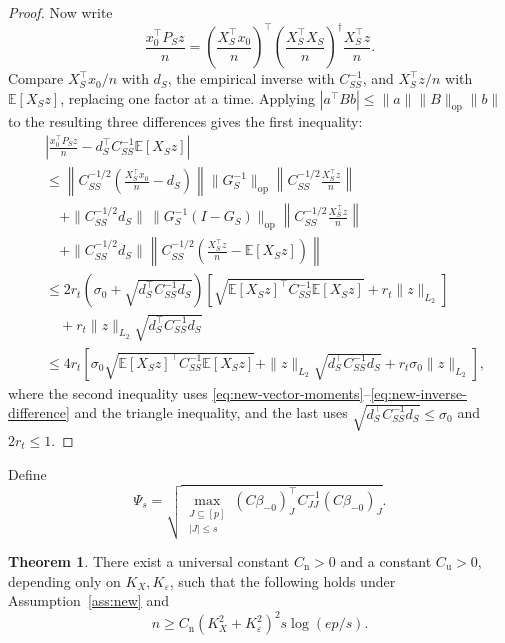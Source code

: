\documentclass[a4paper,10pt,english]{article}
\theoremstyle{definition}
\newtheorem{theorem}[proposition]{Theorem}
\begin{document}
\begin{review}
\begin{proof}
Now write
\[
 \frac{x_0^\top P_Sz}{n}
 =
 \left(\frac{X_S^\top x_0}{n}\right)^\top
 \left(\frac{X_S^\top X_S}{n}\right)^\dagger
 \frac{X_S^\top z}{n}.
\]
\rbreak
Compare \(X_S^\top x_0/n\) with \(d_S\), the empirical inverse with
\(C_{SS}^{-1}\), and \(X_S^\top z/n\) with \(\mathbb E[X_Sz]\),
replacing one factor at a time.
\rbreak
Applying \(|a^\top B b|\le\|a\|\|B\|_{\mathrm{op}}\|b\|\)
to the resulting three differences gives the first inequality:
\begin{equation}\label{eq:new-projected-assembly}
 \begin{aligned}
 &\left|
 \frac{x_0^\top P_Sz}{n}
 -d_S^\top C_{SS}^{-1}\mathbb E[X_Sz]
 \right|\\
 &\le
 \left\|
 C_{SS}^{-1/2}\left(\frac{X_S^\top x_0}{n}-d_S\right)
 \right\|
 \|G_S^{-1}\|_{\mathrm{op}}
 \left\|C_{SS}^{-1/2}\frac{X_S^\top z}{n}\right\|\\
 &\quad+
 \|C_{SS}^{-1/2}d_S\|\,
 \|G_S^{-1}(I-G_S)\|_{\mathrm{op}}
 \left\|C_{SS}^{-1/2}\frac{X_S^\top z}{n}\right\|\\
 &\quad+
 \|C_{SS}^{-1/2}d_S\|
 \left\|
 C_{SS}^{-1/2}\left(\frac{X_S^\top z}{n}-\mathbb E[X_Sz]\right)
 \right\|\\
 &\le
 2r_t\left(\sigma_0+\sqrt{d_S^\top C_{SS}^{-1}d_S}\right)
 \left[
 \sqrt{\mathbb E[X_Sz]^\top C_{SS}^{-1}\mathbb E[X_Sz]}
 +r_t\|z\|_{L_2}
 \right]\\
 &\quad+
 r_t\|z\|_{L_2}\sqrt{d_S^\top C_{SS}^{-1}d_S}\\
 &\le
 4r_t\left[
 \sigma_0
 \sqrt{\mathbb E[X_Sz]^\top C_{SS}^{-1}\mathbb E[X_Sz]}
 +\|z\|_{L_2}\sqrt{d_S^\top C_{SS}^{-1}d_S}
 +r_t\sigma_0\|z\|_{L_2}
 \right],
 \end{aligned}
\end{equation}
where the second inequality uses
\eqref{eq:new-vector-moments}--\eqref{eq:new-inverse-difference}
and the triangle inequality, and the last uses
\(\sqrt{d_S^\top C_{SS}^{-1}d_S}\le\sigma_0\) and \(2r_t\le1\).
\end{proof}

Define
\begin{equation}\label{eq:new-psi}
 \Psi_s
 =
 \sqrt{
 \max_{\substack{J\subseteq[p]\\|J|\le s}}
 (C\beta_{-0})_J^\top C_{JJ}^{-1}(C\beta_{-0})_J
 }.
\end{equation}

\begin{theorem}\label{thm:new-search}
There exist a universal constant \(C_{\mathrm n}>0\) and a constant
\(C_{\mathrm u}>0\), depending only on \(K_X,K_\varepsilon\),
such that the following holds under Assumption~\ref{ass:new} and
\begin{equation}\label{eq:new-search-sample-size}
 n\ge
 C_{\mathrm n}(K_X^2+K_\varepsilon^2)^2
 s\log(ep/s).
\end{equation}


\end{theorem}
\end{review}
\end{document}
